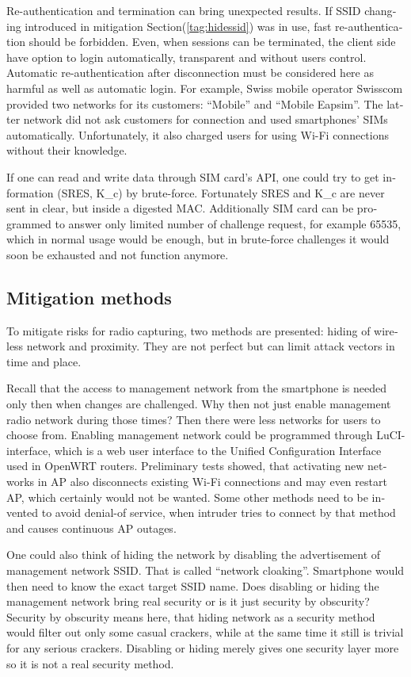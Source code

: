 \documentclass[12pt,a4paper,english]{tutthesis}
\begin{document}
\begin{otherlanguage}{english}
Re-authentication and termination can bring unexpected results.
If SSID changing introduced in mitigation Section(\ref{tag:hidessid}) was in use, fast re-authentication
should be forbidden\cite[p.11]{rfc5448}.
Even, when sessions can be terminated, the client side have 
option to login automatically, transparent and without users control.
Automatic re-authentication after disconnection  must be considered
here as harmful as well as automatic login. For example,
Swiss mobile operator Swisscom provided two networks for its customers:
``Mobile'' and ``Mobile Eapsim''. The latter network did not ask customers
for connection and used smartphones' SIMs automatically. Unfortunately,
it also charged users for using Wi-Fi connections without their 
knowledge.\cite{swisscom}





If one can read and write data through SIM card's API,
one could try to get information (SRES, K\_c) by brute-force. 
Fortunately SRES and K\_c are never sent in clear, but inside
a digested MAC.
 Additionally SIM card can be programmed to answer only
limited number of challenge request, for example 65535, which in
normal usage would be enough, but in brute-force challenges 
it would soon be exhausted and not function anymore.


\subsection{Mitigation methods}
\label{sec-6-5-6}
To mitigate risks for radio capturing, two methods are presented: hiding of
wireless network and proximity. They are not perfect but can
limit attack vectors in time and place.


Recall that the access to management network from the smartphone is
 needed only then when changes
are challenged. Why then not just enable management radio network
during those times? Then there were less networks for users to choose from.
Enabling management network could be programmed through 
LuCI-interface, which is a web user interface to the Unified
 Configuration Interface used in OpenWRT routers.
Preliminary tests showed, that activating new networks in AP also 
disconnects existing Wi-Fi connections and may even restart AP,
which certainly would not be wanted. Some other methods need to
be invented to avoid denial-of service, when intruder tries to 
connect by that method and causes continuous AP outages.

\label{tag:hidessid}
One could also think of hiding the network by disabling the
advertisement of management network SSID. That is called ``network
cloaking''.  Smartphone would then need to know the exact target SSID name.
Does disabling or hiding the management network bring real security or
is it just security by obscurity?  Security by obscurity means here,
that hiding network 
as a security method would filter out only some casual crackers, while
at the same time it still is trivial for any serious crackers.
Disabling or hiding  merely gives one security layer more so it is not
a real security method.


\end{otherlanguage}
\end{document}
